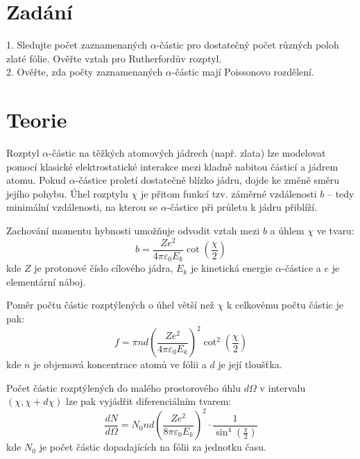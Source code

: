 \documentclass[czech,11pt,a4paper]{article}
\begin{document}
	\begin{multicols}{2}
		\section{Zadání}
		1. Sledujte počet zaznamenaných $\alpha$-částic pro dostatečný počet různých poloh zlaté fólie. Ověřte vztah pro Rutherfordův rozptyl.\\
		2. Ověřte, zda počty zaznamenaných $\alpha$-částic mají Poissonovo rozdělení.
		
		
		\section{Teorie}
		
		
		Rozptyl $\alpha$-částic na těžkých atomových jádrech (např. zlata) lze modelovat pomocí klasické elektrostatické interakce mezi kladně nabitou částicí a jádrem atomu. Pokud $\alpha$-částice proletí dostatečně blízko jádru, dojde ke změně směru jejího pohybu. Úhel rozptylu $\chi$ je přitom funkcí tzv. záměrné vzdálenosti $b$ – tedy minimální vzdálenosti, na kterou se $\alpha$-částice při průletu k jádru přiblíží.
		
		Zachování momentu hybnosti umožňuje odvodit vztah mezi $b$ a úhlem $\chi$ ve tvaru:
		\begin{equation}
			b = \frac{Z e^2}{4 \pi \varepsilon_0 E_k} \cot\left(\frac{\chi}{2}\right)
		\end{equation}
		kde $Z$ je protonové číslo cílového jádra, $E_k$ je kinetická energie $\alpha$-částice a $e$ je elementární náboj.
		
		Poměr počtu částic rozptýlených o úhel větší než $\chi$ k celkovému počtu částic je pak:
		\begin{equation}
			f = \pi n d \left( \frac{Z e^2}{4 \pi \varepsilon_0 E_k} \right)^2 \cot^2\left(\frac{\chi}{2}\right)
		\end{equation}
		kde $n$ je objemová koncentrace atomů ve fólii a $d$ je její tloušťka.
		
		Počet částic rozptýlených do malého prostorového úhlu $d\Omega$ v intervalu $(\chi, \chi + d\chi)$ lze pak vyjádřit diferenciálním tvarem:
		\begin{equation}
			\frac{dN}{d\Omega} = N_0 n d \left( \frac{Z e^2}{8 \pi \varepsilon_0 E_k} \right)^2 \cdot \frac{1}{\sin^4\left(\frac{\chi}{2}\right)}
		\end{equation}
		kde $N_0$ je počet částic dopadajících na fólii za jednotku času.
		

\end{multicols}
\end{document}
